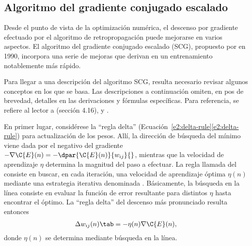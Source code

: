 %
\subsection{Algoritmo del gradiente conjugado escalado}
%
Desde el punto de vista de la optimización numérica, el descenso por
gradiente efectuado por el algoritmo de retropropagación puede
mejorarse en varios aspectos.  El algoritmo del gradiente conjugado
escalado (SCG), propuesto por \cite{scg} en 1990, incorpora una serie
de mejoras que derivan en un entrenamiento notablemente más rápido.

Para llegar a una descripción del algoritmo SCG, resulta necesario
revisar algunos conceptos en los que se basa. Las descripciones a
continuación omiten, en pos de brevedad, detalles en las derivaciones
y fórmulas específicas. Para referencia, se refiere al lector a
\cite{haykin} (sección 4.16), \cite{riedmiller} y \cite{scg}.

En primer lugar, considérese la ``regla delta''
(\iflatexml{}Ecuación~\ref{e2:delta-rule}\else\autoref{e2:delta-rule}\fi)
para actualización de los pesos.  Allí, la dirección de búsqueda del
mínimo viene dada por el negativo del gradiente
$-\nabla\C{E}(n)=-\dpar{\C{E}(n)}{w_{ij}}{}$, mientras que la
velocidad de aprendizaje $\eta$ determina la magnitud del paso a
efectuar.  La regla llamada del  consiste
en buscar, en cada iteración, una velocidad de aprendizaje óptima
$\eta(n)$ mediante una estrategia iterativa denominada .  Básicamente, la búsqueda en la línea consiste en evaluar
la función de error resultante para distintos $\eta$ hasta encontrar
el óptimo.  La ``regla delta'' del descenso más pronunciado resulta
entonces
%
\begin{align}\label{e2:delta-rule-steepest}
  \Delta w_{ij}(n)\tab=-\eta(n)\nabla{\C{E}(n)},
\end{align}
%
donde $\eta(n)$ se determina mediante búsqueda en la línea.

